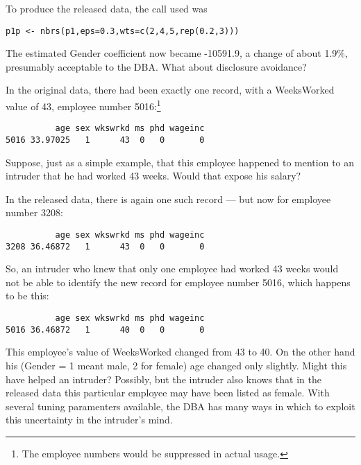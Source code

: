 \documentclass[11pt]{article}
\begin{document}
To produce the released data, the call used was

\begin{lstlisting}
p1p <- nbrs(p1,eps=0.3,wts=c(2,4,5,rep(0.2,3)))
\end{lstlisting}

The estimated Gender coefficient now became -10591.9, a change of about
1.9\%, presumably acceptable to the DBA.  What about disclosure avoidance?

In the original data, there had been exactly one record, with a
WeeksWorked value of 43, employee number 5016:\footnote{The
employee numbers would be suppressed in actual usage.}

\begin{lstlisting}
          age sex wkswrkd ms phd wageinc
5016 33.97025   1      43  0   0       0
\end{lstlisting}

Suppose, just as a simple example, that this employee happened to
mention to an intruder that he had worked 43 weeks.  Would that expose
his salary?

In the released data, there is again one such record --- but now for
employee number 3208:

\begin{lstlisting}
          age sex wkswrkd ms phd wageinc
3208 36.46872   1      43  0   0       0
\end{lstlisting}

So, an intruder who knew that only one employee had worked 43 weeks 
would not be able to identify the new record for employee number 5016,
which happens to be this:

\begin{lstlisting}
          age sex wkswrkd ms phd wageinc
5016 36.46872   1      40  0   0       0
\end{lstlisting}

This employee's value of WeeksWorked changed from 43 to 40.  On the
other hand his (Gender = 1 meant male, 2 for female) age changed only
slightly.  Might this have helped an intruder?  Possibly, but the
intruder also knows that in the released data this particular employee
may have been listed as female.  With several tuning paramenters
available, the DBA has many ways in which to exploit this uncertainty in
the intruder's mind.


\end{document}
